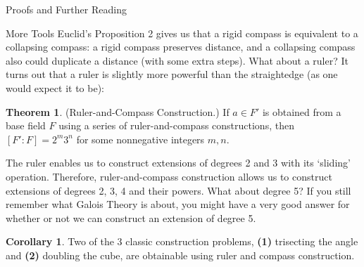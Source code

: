 \documentclass[12pt]{article}
\theoremstyle{definition}
\theoremstyle{definition}
\theoremstyle{definition}
\newtheorem{theorem}{Theorem}[section]
\theoremstyle{definition}
\theoremstyle{definition}
\theoremstyle{definition}
\newtheorem{corollary}{Corollary}[section]
\theoremstyle{definition}
\begin{document}
\begin{section}{Proofs and Further Reading}
\begin{subsection}{More Tools}
        Euclid's Proposition 2 gives us that a rigid compass is equivalent to a collapsing compass: a rigid compass preserves distance, 
        and a collapsing compass also could duplicate a distance (with some extra steps). What about a ruler? It turns out that a ruler is 
        slightly more powerful than the straightedge (as one would expect it to be): 
        
        \begin{theorem}{(Ruler-and-Compass Construction.)}
            If \(a\in F'\) is obtained from a base field \(F\) using a series of ruler-and-compass constructions, then \([F':F] = 2^m 3^n\)
            for some nonnegative integers \(m,n\). 
        \end{theorem}
        The ruler enables us to construct extensions of degrees 2 and 3 with its `sliding' operation. Therefore, ruler-and-compass construction 
        allows us to construct extensions of degrees 2, 3, 4 and their powers. What about degree 5? If you still remember what Galois Theory is about,
        you might have a very good answer for whether or not we can construct an extension of degree 5.
        
        \begin{corollary}
            Two of the 3 classic construction problems, \textbf{(1)} trisecting the angle and \textbf{(2)} doubling the cube, are obtainable using 
            ruler and compass construction.
        \end{corollary}
    \end{subsection}


\end{section}
\end{document}
